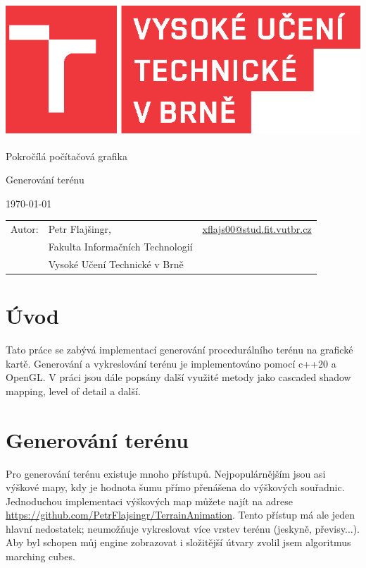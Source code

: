 \documentclass[12pt,a4paper,titlepage,final]{report}
\makeatletter
\newcommand\Course{Pokročílá počítačová grafika}
\newcommand\WorkTitle{Generování terénu}
\newcommand\AuthorA{Petr Flajšingr}
\newcommand\AuthorAEmail{xflajs00@stud.fit.vutbr.cz}
\newcommand\Faculty{Fakulta Informačních Technologií}
\newcommand\School{Vysoké Učení Technické v Brně}
\makeatother
\begin{document}
	\begin{titlepage}
	\begin{center}
		\includegraphics[height=5cm]{images/logo.eps}
	\end{center}
	\vfill
	\begin{center}
		\begin{Large}
			\Course\\
		\end{Large}
		\bigskip
		\begin{Huge}
			\WorkTitle\\
		\end{Huge}
	\end{center}
	\vfill
	\begin{center}
		\begin{large}
			\today
		\end{large}
	\end{center}
	\vfill
	\begin{flushleft}
		\begin{large}
			\begin{tabular}{lll}
				Autor: & \AuthorA, & \url{\AuthorAEmail} \\
				& \Faculty \\
				& \School \\
			\end{tabular}
		\end{large}
	\end{flushleft}
\end{titlepage}		

\section{Úvod}
Tato práce se zabývá implementací generování procedurálního terénu na grafické kartě. Generování a vykreslování terénu je implementováno pomocí c++20 a OpenGL. V práci jsou dále popsány další využité metody jako cascaded shadow mapping, level of detail a další.

\section{Generování terénu}
Pro generování terénu existuje mnoho přístupů. Nejpopulárnějším jsou asi výškové mapy, kdy je hodnota šumu přímo přenášena do výškových souřadnic. Jednoduchou implementaci výškových map můžete najít na adrese \url{https://github.com/PetrFlajsingr/TerrainAnimation}. Tento přístup má ale jeden hlavní nedostatek; neumožňuje vykreslovat více vrstev terénu (jeskyně, převisy...). Aby byl schopen můj engine zobrazovat i složitější útvary zvolil jsem algoritmus marching cubes.
\end{document}
